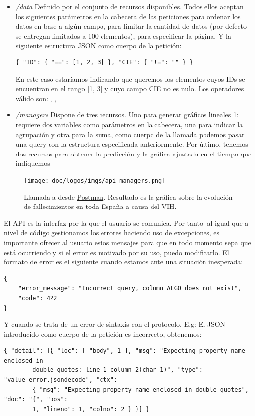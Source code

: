 \begin{itemize}
    \item \textit{/data} Definido por el conjunto de recursos disponibles. Todos ellos
    aceptan los siguientes parámetros en la cabecera de las peticiones 
    para ordenar los datos en base a algún campo,  para limitar la
    cantidad de datos (por defecto se entregan limitados a 100 elementos), 
    para especificar la página. Y la siguiente estructura JSON como cuerpo de la petición:
    \begin{lstlisting}[caption=Body de una posible petición a \codeword{POST /data/diceases}] 
        { "ID": { "==": [1, 2, 3] }, "CIE": { "!=": "" } }
    \end{lstlisting}
    En este caso estaríamos indicando que queremos los elementos cuyos IDs se encuentran
    en el rango [1, 3] y cuyo campo CIE no es nulo. Los operadores válido son:
    \codeword{==}, \codeword{<}, \codeword{>}

    \item \textit{/managers} Dispone de tres recursos. Uno para generar gráficos lineales
    \ref{fig:graficos-api}: requiere dos variables como parámetros en la cabecera, una
    para indicar la agrupación y otra para la suma, como cuerpo de la llamada podemos
    pasar una query con la estructura especificada anteriormente. Por último, tenemos dos
    recursos para obtener la predicción y la gráfica ajustada en el tiempo que indiquemos.
\end{itemize}

\FloatBarrier
\begin{figure}[h]
	\centering	
	\texttt{[image: doc/logos/imgs/api-managers.png]}
	\caption{ Llamada a  desde
	\href{https://www.postman.com/}{Postman}. Resultado es la gráfica sobre la evolución
	de fallecimientos en toda España a causa del VIH. }
    \label{fig:graficos-api}
\end{figure}
\FloatBarrier

El API es la interfaz por la que el usuario se comunica. Por tanto, al igual que a nivel
de código gestionamos los errores haciendo uso de excepciones, es importante ofrecer al
usuario estos mensajes para que en todo momento sepa que está ocurriendo y si el error es
motivado por su uso, puedo modificarlo. El formato de error es el siguiente cuando estamos
ante una situación inesperada:
\begin{verbatim}
{
    "error_message": "Incorrect query, column ALGO does not exist",
    "code": 422
}
\end{verbatim}
Y cuando se trata de un error de sintaxis con el protocolo. E.g: El JSON introducido como
cuerpo de la petición es incorrecto, obtenemos:
\begin{lstlisting}[caption=Error de sintaxis en el body.] 
    { "detail": [{ "loc": [ "body", 1 ], "msg": "Expecting property name enclosed in
        double quotes: line 1 column 2(char 1)", "type": "value_error.jsondecode", "ctx":
        { "msg": "Expecting property name enclosed in double quotes", "doc": "{", "pos":
        1, "lineno": 1, "colno": 2 } }] }
\end{lstlisting}


